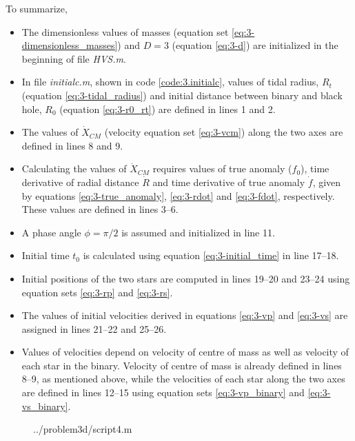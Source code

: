 \documentclass[a4paper]{article}
\begin{document}
\begin{enumerate} [label*=\textbf{(\alph*)}]
					To summarize,
					\begin{itemize}
						\item The dimensionless values of masses (equation set \ref{eq:3-dimensionless_masses}) and \(D=3\) (equation \ref{eq:3-d}) are initialized in the beginning of file \emph{HVS.m}.
						\item In file \emph{initialc.m}, shown in code \ref{code:3.initialc}, values of tidal radius, \(R_t\) (equation \ref{eq:3-tidal_radius}) and initial distance between binary and black hole, \(R_0\) (equation \ref{eq:3-r0_rt}) are defined in lines 1 and 2.
						\item The values of \(\dot{X}_{CM}^{}\) (velocity equation set \ref{eq:3-vcm}) along the two axes are defined in lines 8 and 9.
						\item Calculating the values of \(\dot{X}_{CM}^{}\) requires values of true anomaly (\(f_0\)), time derivative of radial distance \(\dot{R}\) and time derivative of true anomaly \(\dot{f}\), given by equations \ref{eq:3-true_anomaly}, \ref{eq:3-rdot} and \ref{eq:3-fdot}, respectively. These values are defined in lines 3--6.
						\item A phase angle \(\phi = \pi/2\) is assumed and initialized in line 11.
						\item Initial time \(t_0\) is calculated using equation \ref{eq:3-initial_time} in line 17--18.
						\item Initial positions of the two stars are computed in lines 19--20 and 23--24 using equation sets \ref{eq:3-rp} and \ref{eq:3-rs}.
						\item The values of initial velocities derived in equations \ref{eq:3-vp} and \ref{eq:3-vs} are assigned in lines 21--22 and 25--26.
						\item Values of velocities depend on velocity of centre of mass as well as velocity of each star in the binary. Velocity of centre of mass is already defined in lines 8--9, as mentioned above, while the velocities of each star along the two axes are defined in lines 12--15 using equation sets \ref{eq:3-vp_binary} and \ref{eq:3-vs_binary}.
					\end{itemize}
					
					\begin{figure}
						 {../problem3d/script4.m}
					\end{figure}
					

\end{enumerate}
\end{document}
